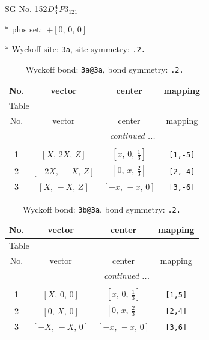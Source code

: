 \documentclass[fleqn,8pt]{jsarticle}
\begin{document}
\setcounter{MaxMatrixCols}{32}

\renewcommand{\tablename}{Table~}
\renewcommand{\figurename}{Figure~}
\begin{center}
\LARGE
SG No. 152\quad$D_{\rm 3}^{4}$\quad$P3_121$\quad[ trigonal ]
\end{center}

* plus set:\,\,\,$+\left[ 0,\, 0,\, 0 \right]$


* Wyckoff site: {\tt 3a}, site symmetry: {\tt .2.}
\renewcommand{\arraystretch}{1.2}
\begin{longtable}{cccc}
\caption{Wyckoff bond: {\tt 3a@3a}, bond symmetry: {\tt .2.}}
 \\
 \hline \hline
No. & vector & center & mapping \\ \hline \endfirsthead

\multicolumn{3}{l}{\tablename\ \thetable{}} \\
 \hline \hline
No. & vector & center & mapping \\ \hline \endhead

 \hline \hline
\multicolumn{3}{r}{\footnotesize\it continued ...} \\ \endfoot

 \hline \hline
\multicolumn{3}{r}{} \\ \endlastfoot

1 & $\left[ X,\, 2 X,\, Z \right]$ & $\left[ x,\, 0,\, \frac{1}{3} \right]$ & {\tt [1,-5]} \\ \hline
2 & $\left[ - 2 X,\, - X,\, Z \right]$ & $\left[ 0,\, x,\, \frac{2}{3} \right]$ & {\tt [2,-4]} \\ \hline
3 & $\left[ X,\, - X,\, Z \right]$ & $\left[ - x,\, - x,\, 0 \right]$ & {\tt [3,-6]} \\
\end{longtable}
\renewcommand{\arraystretch}{1.2}
\begin{longtable}{cccc}
\caption{Wyckoff bond: {\tt 3b@3a}, bond symmetry: {\tt .2.}}
 \\
 \hline \hline
No. & vector & center & mapping \\ \hline \endfirsthead

\multicolumn{3}{l}{\tablename\ \thetable{}} \\
 \hline \hline
No. & vector & center & mapping \\ \hline \endhead

 \hline \hline
\multicolumn{3}{r}{\footnotesize\it continued ...} \\ \endfoot

 \hline \hline
\multicolumn{3}{r}{} \\ \endlastfoot

1 & $\left[ X,\, 0,\, 0 \right]$ & $\left[ x,\, 0,\, \frac{1}{3} \right]$ & {\tt [1,5]} \\ \hline
2 & $\left[ 0,\, X,\, 0 \right]$ & $\left[ 0,\, x,\, \frac{2}{3} \right]$ & {\tt [2,4]} \\ \hline
3 & $\left[ - X,\, - X,\, 0 \right]$ & $\left[ - x,\, - x,\, 0 \right]$ & {\tt [3,6]} \\
\end{longtable}
\end{document}
